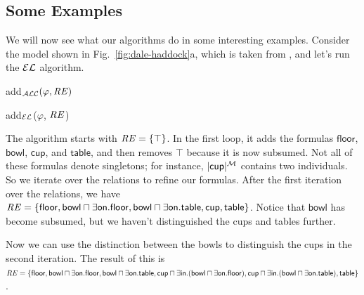 
\subsection{Some Examples}\label{sec:examples}

We will now see what our algorithms do in some interesting
examples. Consider the model shown in
Fig.~\ref{fig:dale-haddock}a, which is taken from
, and
let's run the $\mathcal{EL}$ algorithm.


\begin{algorithm}[t]
\caption{add$_\mathcal{ALC}(\varphi,\mathit{RE})$}
\label{algo:bisim-add-alc}
\end{algorithm}
%
\begin{algorithm}[t]
\dontprintsemicolon
\caption{add$_\mathcal{EL}$($\varphi$, $\mathit{RE}$)}
\label{algo:bisim-add-el}
\end{algorithm}

The algorithm starts with $\mathit{RE} = \{\top\}$.  In the first loop, it
adds the formulas $\mathsf{floor}$, $\mathsf{bowl}$, $\mathsf{cup}$,
and $\mathsf{table}$, and then removes $\top$ because it is now
subsumed.  Not all of these formulas denote singletons; for instance,
$|\mathsf{cup}|^{\mathcal{M}}$ contains two individuals.  So we iterate over the
relations to refine our formulas.  After the first iteration over the
relations, we have $\mathit{RE} = \{ \mathsf{floor}, \mathsf{bowl} \sqcap
\exists \mathsf{on}.\mathsf{floor}, \mathsf{bowl} \sqcap \exists
\mathsf{on}.\mathsf{table}, \mathsf{cup}, \mathsf{table} \}$. Notice
that $\mathsf{bowl}$ has become subsumed, but we haven't distinguished
the cups and tables further.

Now we can use the distinction between the bowls to distinguish the
cups in the second iteration.  The result of this is $\mathit{RE} = \{
\mathsf{floor}, \mathsf{bowl} \sqcap \exists
\mathsf{on}.\mathsf{floor}, \mathsf{bowl} \sqcap \exists
\mathsf{on}.\mathsf{table}, \mathsf{cup} \sqcap \exists
\mathsf{in}. (\mathsf{bowl} \sqcap \exists
\mathsf{on}.\mathsf{floor}), \mathsf{cup} \sqcap \exists
\mathsf{in}. (\mathsf{bowl} \sqcap \exists
\mathsf{on}.\mathsf{table}), \mathsf{table} \}$.

